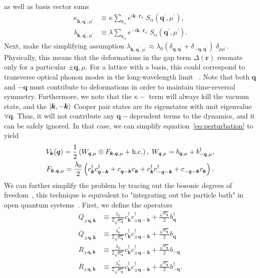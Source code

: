 \documentclass[preprint,5p,times,twocolumn]{elsarticle}
\newcommand{\bmk}{\bm{k}}
\newcommand{\bmq}{\bm{q}}
\newcommand{\bmr}{\bm{r}}
\begin{document}
as well as basis vector sums
\begin{align}
    \kappa^{\;}_{\bmk,\bmq^\prime,\mu^\prime} &\equiv\kappa\sum_{\bmr_\alpha}e^{i\bmk\cdot \bmr_\alpha}\;S_\alpha(\bmq^\prime,\mu^\prime),\nonumber\\
    \lambda^{\;}_{\bmk,\bmq^\prime,\mu^\prime} &\equiv \lambda\sum_{\bmr_\alpha}e^{-i\bmk\cdot \bmr_\alpha}\;S_\alpha(\bmq^\prime,\mu^\prime).
\end{align}
Next, make the simplifying assumption $\lambda^{\;}_{\bmk,\bmq^\prime,\mu^\prime}\approx \lambda_0 \left(\delta_{\bmq, \bmq^\prime} + \delta_{-\bmq, \bmq^\prime}\right)\;\delta_{\mu\mu^\prime}$. Physically, this means that the deformations in the gap term $\Delta(\bmr)$ resonate only for a particular $\pm\bmq, \mu$. For a lattice with a basis, this could correspond to transverse optical phonon modes in the long-wavelength limit ~\citep{marder:ch13}. Note that both $\bmq$ and $-\bmq$ must contribute to deformations in order to maintain time-reversal symmetry. Furthermore, we note that the $\kappa-$ term will always kill the vacuum state, and the $\ket{\bmk, -\bmk}$ Cooper pair states are its eigenstates with unit eigenvalue $\forall \bmq$. Thus, it will not contribute any $\bmq-$dependent terms to the dynamics, and it can be safely ignored. In that case, we can simplify equation~\ref{eq:perturbation} to yield
\begin{gather}
    V_{\bmk}(\bmq) = \frac12\left(W_{\bmq,\mu}\otimes F_{\bmk,\bmq,\mu} + \rm{h.c.}\right)\label{eq:perturbation:simplified}, \;     W_{\bmq,\mu} =b_{\bmq,\mu} + b^\dagger_{-\bmq,\mu},\nonumber\\
    F_{\bmk,\bmq,\mu} = \frac{\lambda_0}{2}\left( c^\dagger_{\bmk}c^\dagger_{\bmq-\bmk}+c^{\;}_{\bmq-\bmk}c^{\;}_{\bmk} + c^\dagger_{\bmk}c^\dagger_{-\bmq-\bmk}+ c^{\;}_{-\bmq-\bmk}c^{\;}_{\bmk}\right).
    \label{eq:perturbation:gathered}
\end{gather}
We can further simplify the problem by tracing out the bosonic degrees of freedom~\citep{PhysRevB.102.235154}, this technique is equivalent to "integrating out the particle bath" in open quantum systems~\citep{10.1093/acprof:oso/9780199213900.001.0001}. First, we define the operators
\begin{align}
    Q_{\pm \bmq,\bmk} &\equiv \frac{\lambda_{0}}{2\sqrt{\nu_{\bmq}}} c^\dagger_{\bmk} c^\dagger_{\pm \bmq -\bmk} + \frac{\sqrt{\nu_{\bmq}}}{2}b^\dagger_{\bmq} \nonumber \\
    \overline{Q}_{\pm \bmq,\bmk} &\equiv \frac{\lambda^\ast_{0}}{2\sqrt{\nu_{\bmq}}} c^\dagger_{\bmk} c^\dagger_{\pm \bmq -\bmk} + \frac{\sqrt{\nu_{\bmq}}}{2}b_{\bmq}  \nonumber\\
    R_{\pm \bmq,\bmk} &\equiv \frac{\lambda_{0}}{2\sqrt{\nu_{\bmq}}} c^\dagger_{\bmk} c^\dagger_{\pm \bmq -\bmk} + \frac{\sqrt{\nu_{\bmq}}}{2}b_{-\bmq}  \nonumber\\
    \overline{R}_{\pm \bmq,\bmk} &\equiv \frac{\lambda^\ast_{0}}{2\sqrt{\nu_{\bmq}}} c^\dagger_{\bmk} c^\dagger_{\pm \bmq -\bmk} + \frac{\sqrt{\nu_{\bmq}}}{2}b^\dagger_{-\bmq}.
\end{align}
\end{document}
